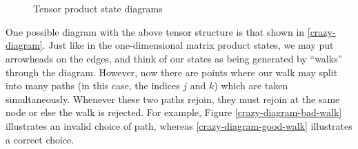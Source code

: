 \documentclass[12pt]{amsbook}
\theoremstyle{plain}
\theoremstyle{definition}
\theoremstyle{remark}
\begin{document}
\begin{figure}
\\
\\
\caption{Tensor product state diagrams}
\end{figure}

One possible diagram with the above tensor structure is that shown in \ref{crazy-diagram}.  Just like in the one-dimensional matrix product states, we may put arrowheads on the edges, and think of our states as being generated by ``walks'' through the diagram.  However, now there are points where our walk may split into many paths (in this case, the indices $j$ and $k$) which are taken simultaneously.  Whenever these two paths rejoin, they must rejoin at the same node or else the walk is rejected.  For example, Figure \ref{crazy-diagram-bad-walk} illustrates an invalid choice of path, whereas \ref{crazy-diagram-good-walk} illustrates a correct choice.
\end{document}
